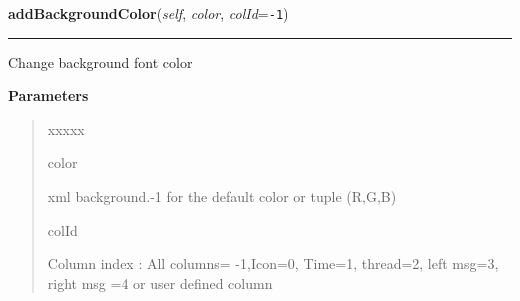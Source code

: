     \label{tracetool:TraceNodeEx:addBackgroundColor}

    \vspace{0.5ex}

\hspace{.8\funcindent}\begin{boxedminipage}{\funcwidth}

    \raggedright \textbf{addBackgroundColor}(\textit{self}, \textit{color}, \textit{colId}={\tt -1})

    \vspace{-1.5ex}

    \rule{\textwidth}{0.5\fboxrule}
\setlength{\parskip}{2ex}
    Change background font color

\setlength{\parskip}{1ex}
      \textbf{Parameters}
      \vspace{-1ex}

      \begin{quote}
        \begin{Ventry}{xxxxx}

          \item[color]

          xml background.-1 for the default color or tuple (R,G,B)

          \item[colId]

          Column index : All columns= -1,Icon=0, Time=1, thread=2, left 
          msg=3, right msg =4 or user defined column

        \end{Ventry}

      \end{quote}

    \end{boxedminipage}

    \label{tracetool:TraceNodeEx:addFontDetail}

    \vspace{0.5ex}

